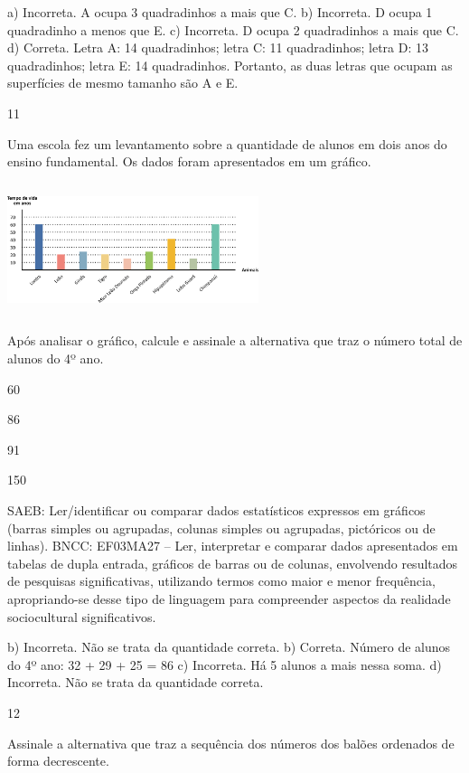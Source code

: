 \begin{multicols}{2}
{\begin{escolha}
{a) Incorreta. A ocupa 3 quadradinhos a mais que C.
b) Incorreta. D ocupa 1 quadradinho a menos que E.
c) Incorreta. D ocupa 2 quadradinhos a mais que C.
d) Correta. Letra A: 14 quadradinhos; letra C: 11 quadradinhos; letra D: 13 quadradinhos; letra E: 14 quadradinhos. Portanto, as duas letras que ocupam as superfícies de mesmo tamanho são A e E.

\num{11}

Uma escola fez um levantamento sobre a quantidade de alunos em dois anos
do ensino fundamental. Os dados foram apresentados em um gráfico.


\includegraphics[width=2.89744in,height=1.52156in]{media/image112.png}

Após analisar o gráfico, calcule e assinale a alternativa que traz o número total de alunos do 4º ano.

\begin{escolha}
\item
  60
\item
  86
\item
  91
\item
  150
\end{escolha}

SAEB: Ler/identificar ou comparar dados estatísticos
expressos em gráficos (barras simples ou agrupadas, colunas simples ou
agrupadas, pictóricos ou de linhas).
BNCC: EF03MA27 -- Ler, interpretar e comparar dados apresentados em tabelas de dupla entrada,
gráficos de barras ou de colunas, envolvendo resultados de pesquisas significativas, utilizando
termos como maior e menor frequência, apropriando-se desse tipo de linguagem para
compreender aspectos da realidade sociocultural significativos.

b) Incorreta. Não se trata da quantidade correta.
b) Correta. Número de alunos do 4º ano: 32 + 29 + 25 = 86 
c) Incorreta. Há 5 alunos a mais nessa soma.
d) Incorreta. Não se trata da quantidade correta.

\num{12}

Assinale a alternativa que traz a sequência dos números dos balões ordenados de forma decrescente.

}
\end{escolha}}
\end{multicols}
